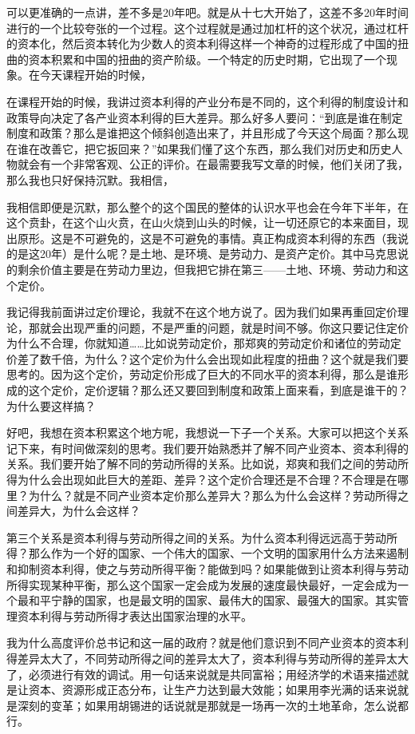\documentclass[UTF8, 12pt, a4paper]{ctexrep}
\begin{document}
可以更准确的一点讲，差不多是20年吧。就是从十七大开始了，这差不多20年时间进行的一个比较夸张的一个过程。这个过程就是通过加杠杆的这个状况，通过杠杆的资本化，然后资本转化为少数人的资本利得这样一个神奇的过程形成了中国的扭曲的资本积累和中国的扭曲的资产阶级。一个特定的历史时期，它出现了一个现象。在今天课程开始的时候，

在课程开始的时候，我讲过资本利得的产业分布是不同的，这个利得的制度设计和政策导向决定了各产业资本利得的巨大差异。那么好多人要问：“到底是谁在制定制度和政策？那么是谁把这个倾斜创造出来了，并且形成了今天这个局面？那么现在谁在改善它，把它扳回来？”如果我们懂了这个东西，那么我们对历史和历史人物就会有一个非常客观、公正的评价。在最需要我写文章的时候，他们关闭了我，那么我也只好保持沉默。我相信，

我相信即便是沉默，那么整个的这个国民的整体的认识水平也会在今年下半年，在这个贲卦，在这个山火贲，在山火烧到山头的时候，让一切还原它的本来面目，现出原形。这是不可避免的，这是不可避免的事情。真正构成资本利得的东西（我说的是这20年）是什么呢？是土地、是环境、是劳动力、是资产定价。其中马克思说的剩余价值主要是在劳动力里边，但我把它排在第三——土地、环境、劳动力和这个定价。

我记得我前面讲过定价理论，我就不在这个地方说了。因为我们如果再重回定价理论，那就会出现严重的问题，不是严重的问题，就是时间不够。你这只要记住定价为什么不合理，你就知道……比如说劳动定价，那郑爽的劳动定价和诸位的劳动定价差了数千倍，为什么？这个定价为什么会出现如此程度的扭曲？这个就是我们要思考的。因为这个定价，劳动定价形成了巨大的不同水平的资本利得，那么是谁形成的这个定价，定价逻辑？那么还又要回到制度和政策上面来看，到底是谁干的？为什么要这样搞？

好吧，我想在资本积累这个地方呢，我想说一下子一个关系。大家可以把这个关系记下来，有时间做深刻的思考。我们要开始熟悉并了解不同产业资本、资本利得的关系。我们要开始了解不同的劳动所得的关系。比如说，郑爽和我们之间的劳动所得为什么会出现如此巨大的差距、差异？这个定价合理还是不合理？不合理是在哪里？为什么？就是不同产业资本定价那么差异大？那么为什么会这样？劳动所得之间差异大，为什么会这样？

第三个关系是资本利得与劳动所得之间的关系。为什么资本利得远远高于劳动所得？那么作为一个好的国家、一个伟大的国家、一个文明的国家用什么方法来遏制和抑制资本利得，使之与劳动所得平衡？能做到吗？如果能做到让资本利得与劳动所得实现某种平衡，那么这个国家一定会成为发展的速度最快最好，一定会成为一个最和平宁静的国家，也是最文明的国家、最伟大的国家、最强大的国家。其实管理资本利得与劳动所得才表达出国家治理的水平。

我为什么高度评价总书记和这一届的政府？就是他们意识到不同产业资本的资本利得差异太大了，不同劳动所得之间的差异太大了，资本利得与劳动所得的差异太大了，必须进行有效的调试。用一句话来说就是共同富裕；用经济学的术语来描述就是让资本、资源形成正态分布，让生产力达到最大效能；如果用李光满的话来说就是深刻的变革；如果用胡锡进的话说就是那就是一场再一次的土地革命，怎么说都行。
\end{document}

